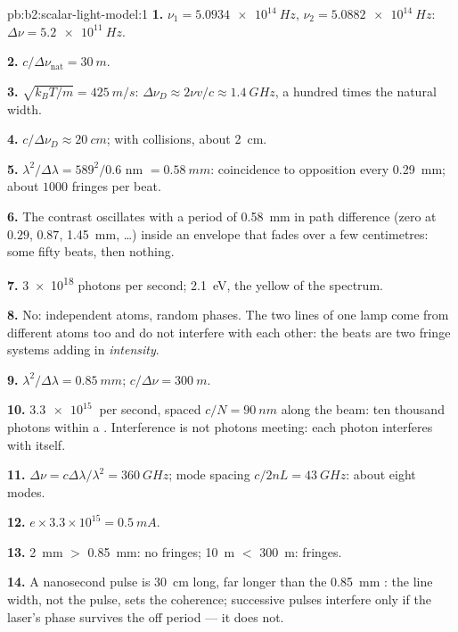 \begin{solution}{pb:b2:scalar-light-model:1}
\textbf{1.} $\nu_1 = \qty{5.0934e14}{Hz}$, $\nu_2 = \qty{5.0882e14}{Hz}$: $\Delta\nu = \qty{5.2e11}{Hz}$.

\textbf{2.} $c/\Delta\nu_{\text{nat}} = \qty{30}{m}$.

\textbf{3.} $\sqrt{k_BT/m} = \qty{425}{m/s}$: $\Delta\nu_D \approx 2\nu v/c \approx \qty{1.4}{GHz}$, a
hundred times the natural width.

\textbf{4.} $c/\Delta\nu_D \approx \qty{20}{cm}$; with collisions, about \qty{2}{cm}.

\textbf{5.} $\lambda^2/\Delta\lambda = 589^2/0.6$ nm $= \qty{0.58}{mm}$: coincidence to
opposition every \qty{0.29}{mm}; about $1000$ fringes per beat.

\textbf{6.} The contrast oscillates with a period of \qty{0.58}{mm} in path
difference (zero at $0.29$, $0.87$, \qty{1.45}{mm}, \dots) inside an envelope
that fades over a few centimetres: some fifty beats, then nothing.

\textbf{7.} \qty{3e18}{} photons per second; \qty{2.1}{eV}, the yellow of the
spectrum.

\textbf{8.} No: independent atoms, random phases. The two lines of one
lamp come from different atoms too and do not interfere with each
other: the beats are two fringe systems adding in \emph{intensity}.

\textbf{9.} $\lambda^2/\Delta\lambda = \qty{0.85}{mm}$; $c/\Delta\nu = \qty{300}{m}$.

\textbf{10.} $\qty{3.3e15}{}$ per second, spaced $c/N = \qty{90}{nm}$ along the beam:
ten thousand photons within a . Interference is not
photons meeting: each photon interferes with itself.

\textbf{11.} $\Delta\nu = c\Delta\lambda/\lambda^2 = \qty{360}{GHz}$; mode spacing $c/2nL = \qty{43}{GHz}$:
about eight modes.

\textbf{12.} $e \times 3.3 \times 10^{15} = \qty{0.5}{mA}$.

\textbf{13.} \qty{2}{mm} $>$ \qty{0.85}{mm}: no fringes; \qty{10}{m} $<$ \qty{300}{m}: fringes.

\textbf{14.} A nanosecond pulse is \qty{30}{cm} long, far longer than the
\qty{0.85}{mm} : the line width, not the pulse, sets the
coherence; successive pulses interfere only if the laser's phase
survives the off period --- it does not.


\end{solution}
